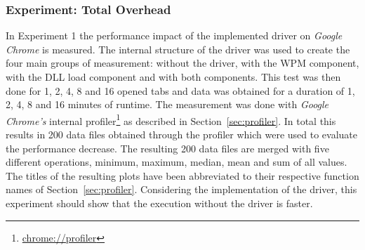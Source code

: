 \subsubsection{Experiment: Total Overhead}
In Experiment 1 the performance impact of the implemented driver on \emph{Google Chrome} is measured. The internal structure of the driver was used to create the four main groups of measurement: without the driver, with the \gls{WPM} component, with the \gls{DLL} load component and with both components. This test was then done for 1, 2, 4, 8 and 16 opened tabs and data was obtained for a duration of 1, 2, 4, 8 and 16 minutes of runtime. The measurement was done with \emph{Google Chrome's} internal profiler\footnote{\url{chrome://profiler}} as described in Section~\ref{sec:profiler}. In total this results in 200 data files obtained through the profiler which were used to evaluate the performance decrease. The resulting 200 data files are merged with five different operations, minimum, maximum, median, mean and sum of all values. The titles of the resulting plots have been abbreviated to their respective function names of Section~\ref{sec:profiler}. Considering the implementation of the driver, this experiment should show that the execution without the driver is faster.
